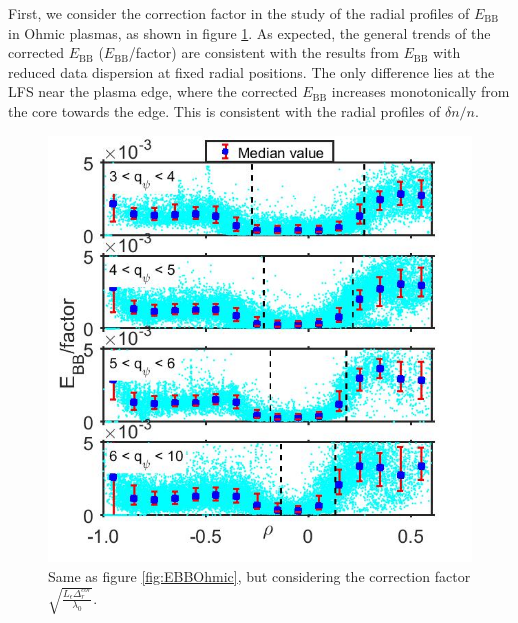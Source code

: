 First, we consider the correction factor in the study of the radial profiles of $E_\mathrm{BB}$ in Ohmic plasmas, as shown in figure \ref{fig:EBB_correct_OH}. As expected, the general trends of the corrected $E_\mathrm{BB}$ ($E_\mathrm{BB}$/factor) are consistent with the results from $E_\mathrm{BB}$ with reduced data dispersion at fixed radial positions. The only difference lies at the LFS near the plasma edge, where the corrected $E_\mathrm{BB}$ increases monotonically from the core towards the edge. This is consistent with the radial profiles of $\delta n/n$.


\begin{figure}[h]
\begin{centering}
\includegraphics[scale=0.5]{fig_EBB_correct_OH.jpg}
\par\end{centering}
\caption{Same as figure \ref{fig:EBBOhmic}, but considering the correction factor $\sqrt{\frac{L_{\epsilon} \Delta_r^{cor}}{\lambda_0}}$.}
\label{fig:EBB_correct_OH}
\end{figure}


